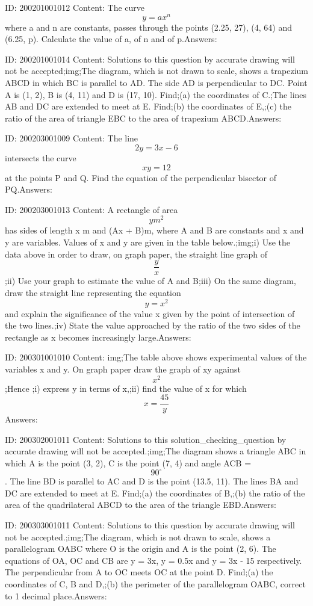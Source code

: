 \documentclass{article}
\begin{document}
ID: 200201001012
Content:
The curve $$y=ax^n$$ where a and n are constants, passes through the points (2.25, 27), (4, 64) and (6.25, p). Calculate the value of a, of n and of p.Answers:

ID: 200201001014
Content:
Solutions to this question by accurate drawing will not be accepted;img;The diagram, which is not drawn to scale, shows a trapezium ABCD in which BC is parallel to AD. The side AD is perpendicular to DC. Point A is (1, 2), B is (4, 11) and D is (17, 10). Find;(a)	the coordinates of C.;The lines AB and DC are extended to meet at E. Find;(b)	the coordinates of E,;(c)	the ratio of the area of triangle EBC to the area of trapezium ABCD.Answers:

ID: 200203001009
Content:
The line $$2y = 3x- 6$$ intersects the curve $$xy = 12$$ at the points P and Q. Find the equation of the perpendicular bisector of PQ.Answers:

ID: 200203001013
Content:
A rectangle of area $$ym^2$$ has sides of length x m and (Ax + B)m, where A and B are constants and x and y are variables. Values of x and y are given in the table below.;img;i) Use the data above in order to draw, on graph paper, the straight line graph of $$\frac{y}{x}$$;ii) Use your graph to estimate the value of A and B;iii) On the same diagram, draw the straight line representing the equation $$y=x^2$$ and explain the significance of the value x given by the point of intersection of the two lines.;iv) State the value approached by the ratio of the two sides of the rectangle as x becomes increasingly large.Answers:

ID: 200301001010
Content:
img;The table above shows experimental values of the variables x and y. On graph paper draw the graph of xy against $$x^2$$;Hence ;i) express y in terms of x,;ii) find the value of x for which $$x=\frac{45}{y}$$Answers:

ID: 200302001011
Content:
Solutions to this solution_checking_question by accurate drawing will not be accepted.;img;The diagram shows a triangle ABC in which A is the point (3, 2), C is the point (7, 4) and angle ACB = $$90^{\circ}$$. The line BD is parallel to AC and D is the point (13.5, 11). The lines BA and DC are extended to meet at E. Find;(a)	the coordinates of B,;(b)	the ratio of the area of the quadrilateral ABCD to the area of the triangle EBD.Answers:

ID: 200303001011
Content:
Solutions to this question by accurate drawing will not be accepted.;img;The diagram, which is not drawn to scale, shows a parallelogram OABC where O is the origin and A is the point (2, 6). The equations of OA, OC and CB are y = 3x, y = 0.5x and y = 3x - 15 respectively. The perpendicular from A to OC meets OC at the point D. Find;(a)	the coordinates of C, B and D,;(b)	the perimeter of the parallelogram OABC, correct to 1 decimal place.Answers:
\end{document}
